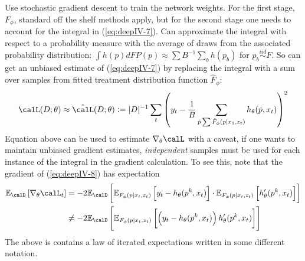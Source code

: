 Use stochastic gradient descent to train the network weights. For the first stage, $F_\phi$, standard off the shelf methods apply, but for the second stage one needs to account for the integral in (\ref{eq:deepIV-7}). Can approximate the integral with respect to a probability measure with the average of draws from the associated probability distribution: $\int h(p)dFP(p) \approx  \sum B^{-1}\sum_b h(p_b)$ for $p_b \overset{iid}{\sim} F$. So can get an unbiased estimate of (\ref{eq:deepIV-7}) by replacing the integral with a sum over samples from fitted treatment distribution function $\hat{F}_\phi$:
\begin{equation}
	\label{eq:deepIV-8}
	\calL(D;\theta)\approx \hat{\calL}(D;\theta) := |D|^{-1}\sum_t\left(y_t - \frac{1}{B} \sum_{\dot{p}\sum \hat{F}_\phi(p|x_1,z_t)} h_\theta (\dot{p},x_t)\right)^2 
\end{equation}
Equation above can be used to estimate $\nabla_\theta \calL$ with a caveat, if one wants to maintain unbiased gradient estimates, \emph{independent} samples must be used for each instance of the integral in the gradient calculation. To see this, note that the gradient of (\ref{eq:deepIV-8}) has expectation 
\begin{equation}
	\label{eq:deepIV-9}
	\begin{split}
		\E_\calD\left[\nabla_\theta\calL_t\right] &= -2\E_\calD\left[\E_{F_\phi(p|x_t,z_t)}\left[y_t - h_\theta(p^k,x_t)\right]\cdot \E_{F_\phi(p|x_t,z_t)}\left[h_\theta'(p^k,x_t)\right]\right] \\
		&\neq -2\E_\calD\left[ \E_{F_\phi(p|x_t,z_t)}\left[\left(y_t - h_\theta(p^k,x_t)\right)h_\theta'(p^k,x_t)\right]\right]
	\end{split}
\end{equation}
The above is contains a law of iterated expectations written in some different notation.


